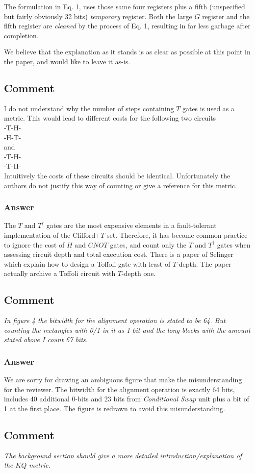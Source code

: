 \documentclass{article}
\newcommand{\comment}{\subsection{Comment}\em}
\newcommand{\answer}{\rm \subsubsection*{Answer}}
\begin{document}
The formulation in Eq. 1, uses those same four registers plus a fifth (unspecified but fairly obviously 32 bits) \emph{temporary} register.  Both the large $G$ register and the fifth register are \emph{cleaned} by the process of Eq. 1, resulting in far less garbage after completion.

We believe that the explanation as it stands is as clear as possible at this point in the paper, and would like to leave it as-is.

\comment

I do not understand why the number of steps containing $T$ gates is used as a
metric. This would lead to different costs for the following two circuits\\
 -T-H-\\ 
 -H-T-\\
and \\ 
 -T-H-\\ 
 -T-H- \\
Intuitively the costs of these circuits should be identical. Unfortunately the authors do not justify this way of counting or give a reference for this metric.

\answer

The $T$ and $T^\dag$ gates are the most expensive elements in a fault-tolerant implementation of the Clifford+$T$ set. Therefore, it has become common practice to ignore the cost of $H$ and $CNOT$ gates, and count only the $T$ and $T^\dag$ gates when assessing circuit depth and total execution cost.
There is a paper of Selinger~\cite{PhysRevA.87.042302} which explain how to design a Toffoli gate with least of $T$-depth. The paper actually archive a Toffoli circuit with $T$-depth one.



\comment
In figure 4 the bitwidth for the alignment operation is stated to be 64. But
counting the rectangles with 0/1 in it as 1 bit and the long blocks with the
amount stated above I count 67 bits.

\answer

We are sorry for drawing an ambiguous figure that make the misunderstanding
for the reviewer. The bitwidth for the alignment operation is exactly 64 bits,
includes 40 additional 0-bits and 23 bits from \emph{Conditional Swap} unit plus a bit
of 1 at the first place.
The figure is redrawn to avoid this misunderstanding.

\comment
The background section should give a more detailed introduction/explanation of
the $KQ$ metric.
\end{document}

